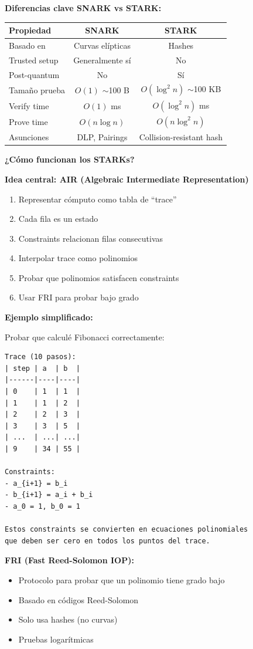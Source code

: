 \documentclass[11pt,a4paper,twoside,openright]{book}
\theoremstyle{definition}
\theoremstyle{plain}
\theoremstyle{remark}
\begin{document}
\begin{mathnote}
\textbf{Diferencias clave SNARK vs STARK:}

\begin{center}
\begin{tabular}{lcc}
\toprule
\textbf{Propiedad} & \textbf{SNARK} & \textbf{STARK} \\
\midrule
Basado en & Curvas elípticas & Hashes \\
Trusted setup & Generalmente sí & No \\
Post-quantum & No & Sí \\
Tamaño prueba & $O(1)$ $\sim$100 B & $O(\log^2 n)$ $\sim$100 KB \\
Verify time & $O(1)$ ms & $O(\log^2 n)$ ms \\
Prove time & $O(n \log n)$ & $O(n \log^2 n)$ \\
Asunciones & DLP, Pairings & Collision-resistant hash \\
\bottomrule
\end{tabular}
\end{center}
\end{mathnote}

\begin{keyidea}
\textbf{¿Cómo funcionan los STARKs?}

\textbf{Idea central: AIR (Algebraic Intermediate Representation)}

\begin{enumerate}
    \item Representar cómputo como tabla de ``trace''
    \item Cada fila es un estado
    \item Constraints relacionan filas consecutivas
    \item Interpolar trace como polinomios
    \item Probar que polinomios satisfacen constraints
    \item Usar FRI para probar bajo grado
\end{enumerate}

\textbf{Ejemplo simplificado:}

Probar que calculé Fibonacci correctamente:
\begin{verbatim}
Trace (10 pasos):
| step | a  | b  |
|------|----|----|
| 0    | 1  | 1  |
| 1    | 1  | 2  |
| 2    | 2  | 3  |
| 3    | 3  | 5  |
| ...  | ...| ...|
| 9    | 34 | 55 |

Constraints:
- a_{i+1} = b_i
- b_{i+1} = a_i + b_i
- a_0 = 1, b_0 = 1

Estos constraints se convierten en ecuaciones polinomiales
que deben ser cero en todos los puntos del trace.
\end{verbatim}

\textbf{FRI (Fast Reed-Solomon IOP):}
\begin{itemize}
    \item Protocolo para probar que un polinomio tiene grado bajo
    \item Basado en códigos Reed-Solomon
    \item Solo usa hashes (no curvas)
    \item Pruebas logarítmicas
\end{itemize}
\end{keyidea}
\end{document}
